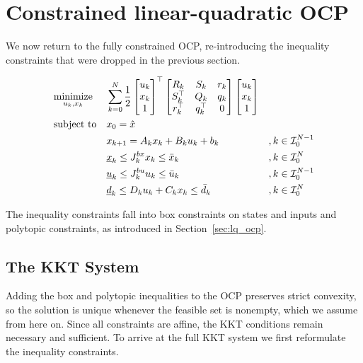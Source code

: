 \section{Constrained linear-quadratic OCP}

We now return to the fully constrained OCP, re-introducing the inequality constraints that were dropped in the previous section.

\[
\begin{aligned}
& \underset{u_k, x_k}{\text{minimize}} & & \sum_{k=0}^{N} \frac{1}{2} \begin{bmatrix} u_{k} \\ x_{k} \\ 1 \end{bmatrix}^\top \begin{bmatrix} R_{k} & S_{k} & r_{k} \\ S_{k}^\top & Q_{k} & q_{k} \\ r_{k}^\top & q_{k}^\top & 0 \end{bmatrix} \begin{bmatrix} u_{k} \\ x_{k} \\ 1 \end{bmatrix} & &                      \\
& \text{subject to}                    & & x_0 = \hat{x}                                                       & &                      \\
&                                      & & x_{k+1} = A_k x_k + B_k u_k + b_k                                   & & ,k\in\mathcal{I}_{0}^{N-1}   \\
&                                      & & \underline{x}_k \leq J_k^{bx} x_k \leq \bar{x}_k                    & & ,k\in\mathcal{I}_{0}^{N}     \\
&                                      & & \underline{u}_k \leq J_k^{bu} u_k \leq \bar{u}_k                    & & ,k\in\mathcal{I}_{0}^{N-1}   \\
&                                      & & \underline{d}_k \leq D_k u_k + C_k x_k \leq \bar{d}_k               & & ,k\in\mathcal{I}_{0}^{N}
\end{aligned}
\]

The inequality constraints fall into box constraints on states and inputs and polytopic constraints, as introduced in Section~\ref{sec:lq_ocp}.

\subsection{The KKT System}

Adding the box and polytopic inequalities to the OCP preserves strict convexity, so the solution is unique whenever the feasible set is nonempty, which we assume from here on.
Since all constraints are affine, the KKT conditions remain necessary and sufficient.
To arrive at the full KKT system we first reformulate the inequality constraints.

